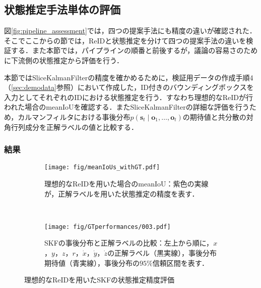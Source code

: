     \subsection{状態推定手法単体の評価}
    \label{subsec:evaluate_estimation}

    図\ref{fig:pipeline_assessment}では，四つの提案手法にも精度の違いが確認された．そこでここからの節では，ReIDと状態推定を分けて四つの提案手法の違いを検証する．また本節では，パイプラインの順番と前後するが，議論の容易さのために下流側の状態推定から評価を行う．

    本節ではSliceKalmanFilterの精度を確かめるために，検証用データの作成手順4（\ref{sec:demodata}参照）において作成した，ID付きのバウンディングボックスを入力としてそれぞれのIDにおける状態推定を行う．すなわち理想的なReIDが行われた場合のmeanIoUを確認する．またSliceKalmanFilterの詳細な評価を行うため，カルマンフィルタにおける事後分布$p(\bm{s}_t \mid \bm{o}_1, \dots, \bm{o}_t)$の期待値と共分散の対角行列成分を正解ラベルの値と比較する．

        \subsubsection{結果}

        \begin{figure}[t]
            \begin{subfigure}[b]{\linewidth}
                \centering
                \texttt{[image: fig/meanIoUs\_withGT.pdf]}
                \caption[理想的なReIDを用いた場合のmeanIoU]{理想的なReIDを用いた場合のmeanIoU：紫色の実線が，正解ラベルを用いた状態推定の精度を表す．}
                \label{fig:meanIoU_withGT}
            \end{subfigure}
            \\
            \begin{subfigure}[b]{\linewidth}
                \centering
                \texttt{[image: fig/GTperformances/003.pdf]}
                \caption[SKFの事後分布と正解ラベルの比較]{SKFの事後分布と正解ラベルの比較：左上から順に，$x$，$y$，$z$，$r$，$\dot{x}$，$\dot{y}$，$\dot{z}$の正解ラベル（黒実線），事後分布期待値（青実線），事後分布の$95\%$信頼区間を表す．}
                \label{fig:SKF_performance}
            \end{subfigure}
            \caption[理想的なReIDを用いたSKFの状態推定精度評価]{理想的なReIDを用いたSKFの状態推定精度評価}
        \end{figure}

